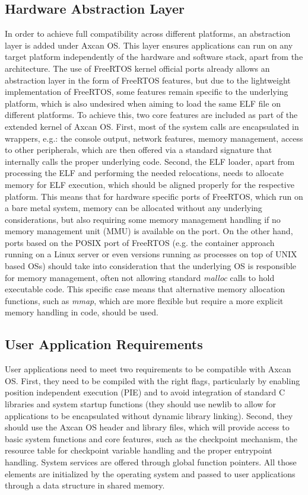 \subsection{Hardware Abstraction Layer}
In order to achieve full compatibility across different platforms, an abstraction layer is added under Axcan OS. This layer ensures applications can run on any target platform independently of the hardware and software stack, apart from the architecture. The use of FreeRTOS kernel official ports already allows an abstraction layer in the form of FreeRTOS features, but due to the lightweight implementation of FreeRTOS, some features remain specific to the underlying platform, which is also undesired when aiming to load the same ELF file on different platforms. To achieve this, two core features are included as part of the extended kernel of Axcan OS. First, most of the system calls are encapsulated in wrappers, e.g.: the console output, network features, memory management, access to other peripherals, which are then offered via a standard signature that internally calls the proper underlying code. Second, the ELF loader, apart from processing the ELF and performing the needed relocations, needs to allocate memory for ELF execution, which should be aligned properly for the respective platform. This means that for hardware specific ports of FreeRTOS, which run on a bare metal system, memory can be allocated without any underlying considerations, but also requiring some memory management handling if no memory management unit (MMU) is available on the port. On the other hand, ports based on the POSIX port of FreeRTOS (e.g. the container approach running on a Linux server or even versions running as processes on top of UNIX based OSs) should take into consideration that the underlying OS is responsible for memory management, often not allowing standard \textit{malloc} calls to hold executable code. This specific case means that alternative memory allocation functions, such as \textit{mmap}, which are more flexible but require a more explicit memory handling in code, should be used. 


\subsection{User Application Requirements}
User applications need to meet two requirements to be compatible with Axcan OS. First, they need to be compiled with the right flags, particularly by enabling position independent execution (PIE) and to avoid integration of standard C libraries and system startup functions (they should use newlib to allow for applications to be encapsulated without dynamic library linking). Second, they should use the Axcan OS header and library files, which will provide access to basic system functions and core features, such as the checkpoint mechanism, the resource table for checkpoint variable handling and the proper entrypoint handling. System services are offered through global function pointers. All those elements are initialized by the operating system and passed to user applications through a data structure in shared memory.

